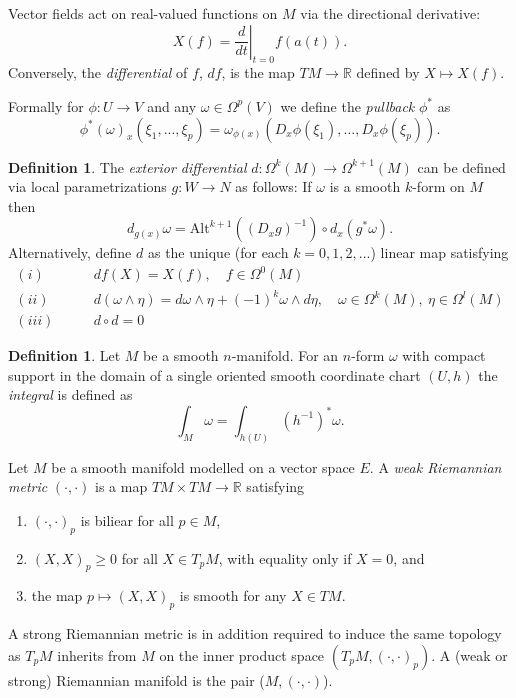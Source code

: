 \documentclass{article}
\theoremstyle{plain}
\theoremstyle{definition}
\newtheorem{defin}[teo]{Definition}
\newcommand{\R}{\ensuremath{\mathbb{R}}}
\newcommand{\Alt}{\ensuremath{\mathrm{Alt}}}
\begin{document}
Vector fields act on real-valued functions on $M$ via the directional derivative:
\[
  X(f)=\left.\frac{d}{dt}\right|_{t=0} f(a(t)).
\]
Conversely, the \textit{differential} of $f$, $df$, is the map $TM\to \R$ defined by $X\mapsto X(f)$.

Formally for $\phi: U\to V$ and any $\omega\in \Omega^p(V)$ we define the \textit{pullback} $\phi^*$ as
\[
 \phi^*(\omega)_x(\xi_1,...,\xi_p)=\omega_{\phi(x)}\left(D_x\phi(\xi_1),...,D_x\phi(\xi_p)\right).
\]


\begin{defin}
	The \textit{exterior differential} $d:\Omega^k(M)\to \Omega^{k+1}(M)$ can be defined via local parametrizations $g:W\to N$ as follows: If $\omega$ is a smooth $k$-form on $M$ then
	\[
	d_{g(x)}\omega= \Alt^{k+1}\left((D_xg)^{-1}\right)\circ d_x(g^*\omega).
	\]
	Alternatively, define $d$ as the unique (for each $k=0,1,2,...$) linear map satisfying
	\begin{align*}
	(i)\qquad & df(X)=X(f),\quad f\in\Omega^0(M)\\
	(ii)\qquad & d(\omega\wedge \eta)=d\omega\wedge \eta + (-1)^k\omega\wedge d\eta,\quad \omega\in\Omega^k(M),\ \eta\in\Omega^l(M)\\
	(iii)\qquad & d\circ d=0
	\end{align*}
\end{defin}


\begin{defin}
	Let $M$ be a smooth $n$-manifold. For an $n$-form $\omega$ with compact support in the domain of a single oriented smooth coordinate chart $(U,h)$ the \textit{integral} is defined as 
	\[
	\int_M\omega = \int_{h(U)}\left(h^{-1}\right)^*\omega.
	\] 
\end{defin}

Let $M$ be a smooth manifold   modelled on a vector space $E$. A \textit{weak Riemannian metric} $(\cdot,\cdot)$ is a map $TM\times TM\to\R$ satisfying 
%
\begin{enumerate}
	\item $(\cdot,\cdot)_p$ is biliear for all $p\in M$, 
	\item $(X,X)_p\geq 0$ for all $X\in T_pM$, with equality only if $X=0$, and
	\item the map $p\mapsto (X,X)_p$ is smooth for any $X\in TM$. 
\end{enumerate}
%
A strong Riemannian metric is in addition required to induce the same topology as $T_pM$ inherits from $M$ on the inner product space $\left(T_pM,(\cdot,\cdot)_p\right)$. A (weak or strong) Riemannian manifold is the pair ($M,(\cdot,\cdot)$).
\end{document}
